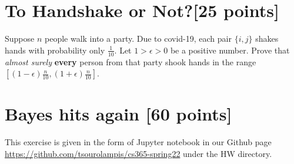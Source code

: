 \section{To Handshake or Not?[25 points]} 

Suppose $n$ people walk into a party. Due to covid-19, each pair $\{i,j\}$ shakes hands with probability only $\frac{1}{10}$. Let $1>\epsilon>0$ be a positive number. Prove that {\it almost surely} {\bf every} person from that party shook hands in the range $[ (1-\epsilon)\frac{n}{10}, (1+\epsilon)\frac{n}{10}]$. 


\section{Bayes hits again [60 points]}

This exercise is given in the form of Jupyter notebook in our Github page \url{https://github.com/tsourolampis/cs365-spring22} under the HW directory.

 
 


